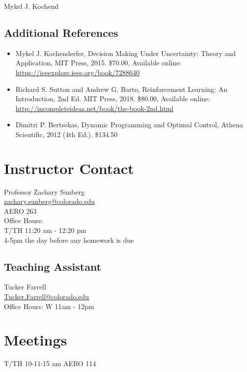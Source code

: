 \documentclass[9pt]{article}
\begin{document}
Mykel J. Kochend

\subsection*{Additional References}

\begin{itemize}[noitemsep]
    \item Mykel J. Kochenderfer, Decision Making Under Uncertainty: Theory and Application, MIT Press, 2015. \$70.00, Available online: \url{https://ieeexplore.ieee.org/book/7288640}
    \item Richard S. Sutton and Andrew G. Barto, Reinforcement Learning: An Introduction, 2nd Ed. MIT Press, 2018. \$80.00, Available online: \url{http://incompleteideas.net/book/the-book-2nd.html}
    \item Dimitri P. Bertsekas, Dynamic Programming and Optimal Control, Athena Scientific, 2012 (4th Ed.). \$134.50
\end{itemize}

\vspace{12pt}
\begin{multicols}{2}
    \begin{minipage}{\columnwidth}
\section*{Instructor Contact}

Professor Zachary Sunberg\\
\href{mailto://zachary.sunberg@colorado.edu}{zachary.sunberg@colorado.edu}\\
AERO 263\\
Office Hours:\\
T/TH 11:20 am - 12:20 pm\\
4-5pm the day before any homework is due


\subsection*{Teaching Assistant}

Tucker Farrell\\
\href{mailto://Tucker.Farrell@colorado.edu}{Tucker.Farrell@colorado.edu}\\
Office Hours: W 11am - 12pm
    \end{minipage}

\section*{Meetings}

T/TH 10-11:15 am AERO 114
\end{multicols}
\end{document}
